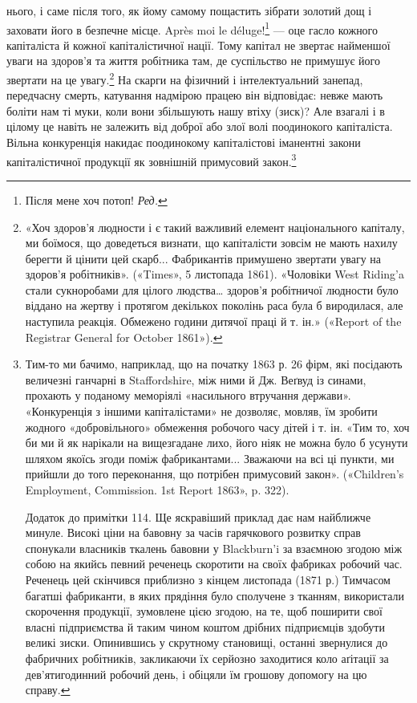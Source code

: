 нього, і саме після того, як йому самому пощастить зібрати золотий
дощ і заховати його в безпечне місце. Après moi le déluge!\footnote*{
Після мене хоч потоп! \emph{Ред.}
} —
оце гасло кожного капіталіста й кожної капіталістичної нації.
Тому капітал не звертає найменшої уваги на здоров’я та життя
робітника там, де суспільство не примушує його звертати на це
увагу.\footnote{
«Хоч здоров'я людности і є такий важливий елемент національного
капіталу, ми боїмося, що доведеться визнати, що капіталісти зовсім
не мають нахилу берегти й цінити цей скарб... Фабрикантів примушено
звертати увагу на здоров'я робітників». («Times», 5 листопада 1861).
«Чоловіки West Riding’a стали сукноробами для цілого людства… здоров’я
робітничої людности було віддано на жертву і протягом декількох
поколінь раса була б виродилася, але наступила реакція. Обмежено
години дитячої праці й т. ін.» («Report of the Registrar General for October
1861»).
} На скарги на фізичний і інтелектуальний занепад,
передчасну смерть, катування надмірою працею він відповідає:
невже мають боліти нам ті муки, коли вони збільшують нашу
втіху (зиск)? Але взагалі і в цілому це навіть не залежить від
доброї або злої волі поодинокого капіталіста. Вільна конкуренція
накидає поодинокому капіталістові іманентні закони капіталістичної
продукції як зовнішній примусовий закон.\footnote{
Тим-то ми бачимо, наприклад, що на початку 1863 р. 26 фірм,
які посідають величезні ганчарні в Staffordshire, між ними й Дж. Веґвуд
із синами, прохають у поданому меморіялі «насильного втручання держави».
«Конкуренція з іншими капіталістами» не дозволяє, мовляв, їм
зробити жодного «добровільного» обмеження робочого часу дітей і т. ін.
«Тим то, хоч би ми й як нарікали на вищезгадане лихо, його ніяк не можна
було б усунути шляхом якоїсь згоди поміж фабрикантами... Зважаючи на
всі ці пункти, ми прийшли до того переконання, що потрібен примусовий
закон». («Children’s Employment, Commission. 1st Report 1863»,
p. 322).

Додаток до примітки 114. Ще яскравіший приклад дає нам найближче
минуле. Високі ціни на бавовну за часів гарячкового розвитку справ спонукали
власників ткалень бавовни у Blackburn’i за взаємною згодою між
собою на якийсь певний реченець скоротити на своїх фабриках робочий
час. Реченець цей скінчився приблизно з кінцем листопада (1871 р.)
Тимчасом багатші фабриканти, в яких прядіння було сполучене з тканням,
використали скорочення продукції, зумовлене цією згодою, на те, щоб
поширити свої власні підприємства й таким чином коштом дрібних підприємців
здобути великі зиски. Опинившись у скрутному становищі,
останні звернулися до фабричних робітників, закликаючи їх серйозно
заходитися коло аґітації за дев’ятигодинний робочий день, і обіцяли їм
грошову допомогу на цю справу.
}

